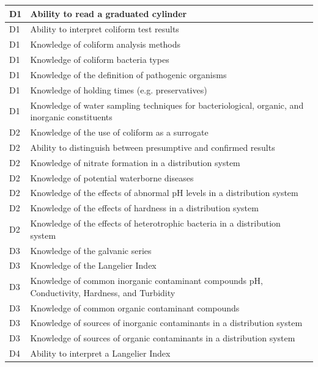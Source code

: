 \begin{table}[H]
\begin{tabular}{| m{1cm} | m{15cm} |}
D1 & Ability to read   a graduated cylinder                                                            \\ \hline
D1 & Ability to interpret   coliform test results                                                      \\ \hline
D1 & Knowledge of coliform   analysis methods                                                          \\ \hline
D1 & Knowledge of coliform   bacteria types                                                            \\ \hline
D1 & Knowledge of the   definition of pathogenic organisms                                             \\ \hline
D1 & Knowledge of holding   times (e.g. preservatives)                                                 \\ \hline
D1 & Knowledge of water   sampling techniques for bacteriological, organic, and inorganic constituents \\ \hline
D2 & Knowledge of the use   of coliform as a surrogate                                                 \\ \hline
D2 & Ability to   distinguish between presumptive and confirmed results                                \\ \hline
D2 & Knowledge of nitrate   formation in a distribution system                                         \\ \hline
D2 & Knowledge of   potential waterborne diseases                                                      \\ \hline
D2 & Knowledge of the   effects of abnormal pH levels in a distribution system                         \\ \hline
D2 & Knowledge of the   effects of hardness in a distribution system                                   \\ \hline
D2 & Knowledge of the   effects of heterotrophic bacteria in a distribution system                     \\ \hline
D3 & Knowledge of the   galvanic series                                                                \\ \hline
D3 & Knowledge of the   Langelier Index                                                                \\ \hline
D3 & Knowledge of common   inorganic contaminant compounds pH, Conductivity, Hardness, and Turbidity   \\ \hline
D3 & Knowledge of common   organic contaminant compounds                                               \\ \hline
D3 & Knowledge of sources   of inorganic contaminants in a distribution system                         \\ \hline
D3 & Knowledge of sources   of organic contaminants in a distribution system                           \\ \hline
D4 & Ability to interpret a Langelier Index                                                            \\ \hline


\end{tabular}
\end{table}
